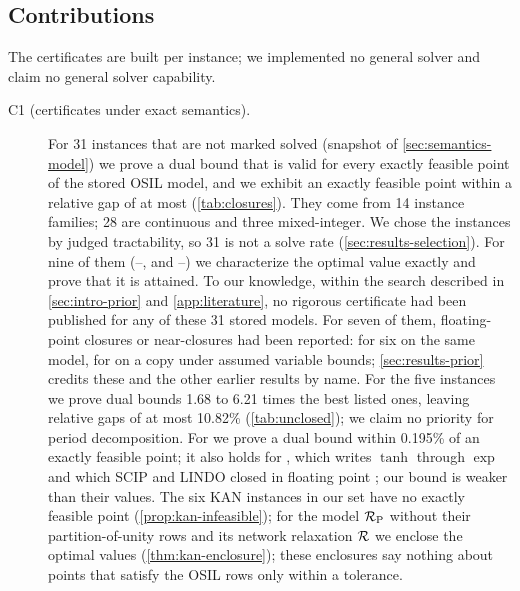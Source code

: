 \subsection{Contributions}\label{sec:intro-contrib}

The certificates are built per instance; we implemented no general solver and claim no general solver capability.

\begin{description}
\item[C1 (certificates under exact semantics).]
For 31 instances that are not marked solved (snapshot of \cref{sec:semantics-model}) we prove a dual bound that is valid for every exactly feasible point of the stored OSIL model, and we exhibit an exactly feasible point within a relative gap of at most  (\cref{tab:closures}).
They come from 14 instance families; 28 are continuous and three mixed-integer.
We chose the instances by judged tractability, so 31 is not a solve rate (\cref{sec:results-selection}).
For nine of them (--,  and --) we characterize the optimal value exactly and prove that it is attained.
To our knowledge, within the search described in \cref{sec:intro-prior} and \cref{app:literature}, no rigorous certificate had been published for any of these 31 stored models.
For seven of them, floating-point closures or near-closures had been reported: for six on the same model, for  on a copy under assumed variable bounds; \cref{sec:results-prior} credits these and the other earlier results by name.
For the five  instances we prove dual bounds 1.68 to 6.21 times the best listed ones, leaving relative gaps of at most 10.82\% (\cref{tab:unclosed}); we claim no priority for period decomposition.
For  we prove a dual bound within 0.195\% of an exactly feasible point; it also holds for , which writes $\tanh$ through $\exp$ and which SCIP and LINDO closed in floating point \citep{vigerske2026-minlplib-a-library-of-mixed}; our bound is weaker than their values.
The six KAN instances in our set have no exactly feasible point (\cref{prop:kan-infeasible}); for the model $\mathcal{R}_{\mathrm{P}}$ without their partition-of-unity rows and its network relaxation $\mathcal{R}$ we enclose the optimal values (\cref{thm:kan-enclosure}); these enclosures say nothing about points that satisfy the OSIL rows only within a tolerance.


\end{description}

